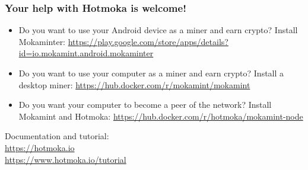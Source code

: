 \documentclass[11pt]{beamer}  %
\begin{document}
\begin{frame}\frametitle{Your help with Hotmoka is welcome!}

  \begin{itemize}
  \item Do you want to use your Android device as a miner and earn crypto?
    Install Mokaminter:
    \url{https://play.google.com/store/apps/details?id=io.mokamint.android.mokaminter}
  \item Do you want to use your computer as a miner and earn crypto? Install a desktop miner: \url{https://hub.docker.com/r/mokamint/mokamint}
  \item Do you want your computer to become a peer of the network?
    Install Mokamint and Hotmoka:
    \url{https://hub.docker.com/r/hotmoka/mokamint-node}
  \end{itemize}

  \begin{center}
    Documentation and tutorial:\\
    \url{https://hotmoka.io}\\
    \url{https://www.hotmoka.io/tutorial}
  \end{center}
\end{frame}
\end{document}
